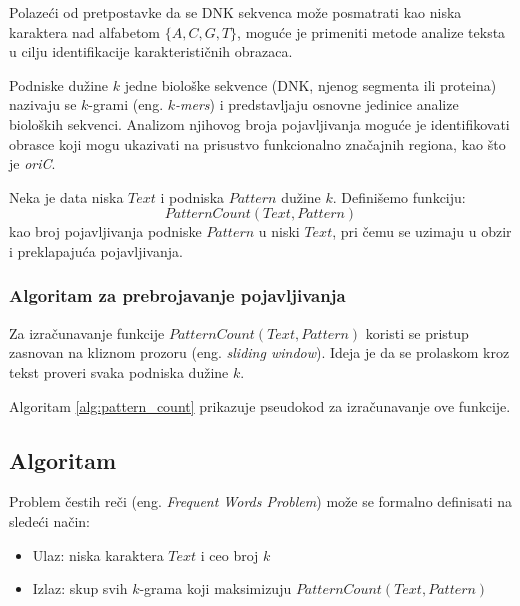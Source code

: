 \documentclass[12pt,oneside]{memoir}
\begin{document}
Polazeći od pretpostavke da se DNK sekvenca može posmatrati kao niska karaktera nad alfabetom $\{A, C, G, T\}$, moguće je primeniti metode analize teksta u cilju identifikacije karakterističnih obrazaca.

Podniske dužine $k$ jedne biološke sekvence (DNK, njenog segmenta ili proteina) nazivaju se $k$-grami (eng.\textit{ $k$-mers}) i predstavljaju osnovne jedinice analize bioloških sekvenci. Analizom njihovog broja pojavljivanja moguće je identifikovati obrasce koji mogu ukazivati na prisustvo funkcionalno značajnih regiona, kao što je \textit{oriC}. 

Neka je data niska $Text$ i podniska $Pattern$ dužine $k$.  Definišemo funkciju:
\[
\textit{PatternCount}(Text, Pattern)
\]
kao broj pojavljivanja podniske $Pattern$ u niski $Text$, pri čemu se uzimaju u obzir i preklapajuća pojavljivanja.

\subsubsection{Algoritam za prebrojavanje pojavljivanja}

Za izračunavanje funkcije $\textit{PatternCount}(Text, Pattern)$ koristi se pristup zasnovan na kliznom prozoru (eng. \textit{sliding window}). Ideja je da se prolaskom kroz tekst proveri svaka podniska dužine $k$.

Algoritam \ref{alg:pattern_count} prikazuje pseudokod za izračunavanje ove funkcije.

\begin{algorithm}[h]
\caption{Pattern Count}
\label{alg:pattern_count}
\SetAlgoLined
\DontPrintSemicolon
{}
\end{algorithm}

\subsection{Algoritam}

Problem čestih reči (eng. \textit{Frequent Words Problem}) može se formalno definisati na sledeći način:

\begin{itemize}
    \item Ulaz: niska karaktera $Text$ i ceo broj $k$
    \item Izlaz: skup svih $k$-grama koji maksimizuju $\textit{PatternCount}(Text, Pattern)$
\end{itemize}
\end{document}
